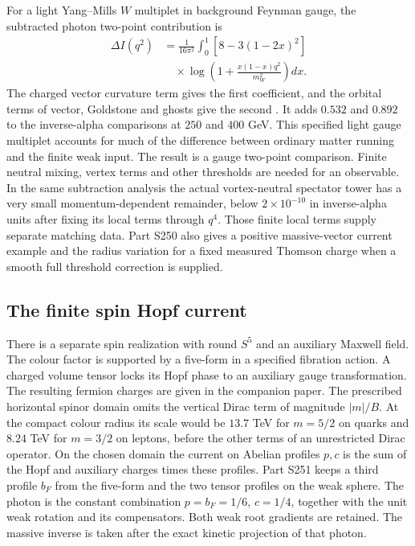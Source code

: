 \documentclass[aps,prd,reprint,onecolumn,nofootinbib,amsmath,amssymb]{revtex4-2}
\begin{document}
For a light Yang--Mills $W$ multiplet in background Feynman gauge, the subtracted photon two-point contribution is
\begin{equation}
 \begin{split}
 \Delta I(q^2)&=\frac{1}{16\pi^2}\int_0^1[8-3(1-2x)^2]\\
 &\quad{}\times\log\!\left(1+\frac{x(1-x)q^2}{m_W^2}\right)dx .
 \end{split}
\end{equation}
The charged vector curvature term gives the first coefficient, and the orbital terms of vector, Goldstone and ghosts give the second \cite{Denner1995Background}. It adds $0.532$ and $0.892$ to the inverse-alpha comparisons at $250$ and $400$ GeV. This specified light gauge multiplet accounts for much of the difference between ordinary matter running and the finite weak input. The result is a gauge two-point comparison. Finite neutral mixing, vertex terms and other thresholds are needed for an observable. In the same subtraction analysis the actual vortex-neutral spectator tower has a very small momentum-dependent remainder, below $2\times10^{-10}$ in inverse-alpha units after fixing its local terms through $q^4$. Those finite local terms supply separate matching data. Part S250 also gives a positive massive-vector current example and the radius variation for a fixed measured Thomson charge when a smooth full threshold correction is supplied.

\subsection{The finite spin Hopf current}
There is a separate spin realization with round $S^5$ and an auxiliary Maxwell field. The colour factor is supported by a five-form in a specified fibration action. A charged volume tensor locks its Hopf phase to an auxiliary gauge transformation. The resulting fermion charges are given in the companion paper. The prescribed horizontal spinor domain omits the vertical Dirac term of magnitude $|m|/B$. At the compact colour radius its scale would be $13.7$ TeV for $m=5/2$ on quarks and $8.24$ TeV for $m=3/2$ on leptons, before the other terms of an unrestricted Dirac operator. On the chosen domain the current on Abelian profiles $p,c$ is the sum of the Hopf and auxiliary charges times these profiles. Part S251 keeps a third profile $b_F$ from the five-form and the two tensor profiles on the weak sphere. The photon is the constant combination $p=b_F=1/6$, $c=1/4$, together with the unit weak rotation and its compensators. Both weak root gradients are retained. The massive inverse is taken after the exact kinetic projection of that photon.
\end{document}

